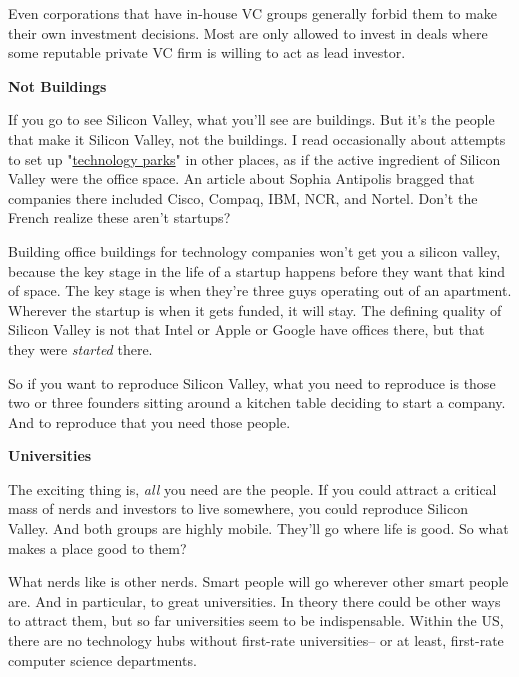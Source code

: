 Even corporations that
                  have in-house VC groups generally forbid them to make their
                  own investment decisions. Most are only allowed to invest in
                  deals where some reputable private VC firm is willing to act
                  as lead investor.

\textbf{Not Buildings}

If you go to see Silicon Valley, what you'll see
                  are buildings. But it's the people that make it Silicon
                  Valley, not the buildings. I read occasionally about attempts
                  to set up "\href{http://www.google.com/search?q=technology+park}{technology parks}" in other places, as if the active ingredient of Silicon
                  Valley were the office space. An article about Sophia
                  Antipolis bragged that companies there included Cisco, Compaq,
                  IBM, NCR, and Nortel. Don't the French realize these aren't
                  startups?

Building office buildings for technology
                  companies won't get you a silicon valley, because the key
                  stage in the life of a startup happens before they want that
                  kind of space. The key stage is when they're three guys
                  operating out of an apartment. Wherever the startup is when it
                  gets funded, it will stay. The defining quality of Silicon
                  Valley is not that Intel or Apple or Google have offices
                  there, but that they were \emph{started} there.

So
                  if you want to reproduce Silicon Valley, what you need to
                  reproduce is those two or three founders sitting around a
                  kitchen table deciding to start a company. And to reproduce
                  that you need those people.

\textbf{Universities}

The exciting thing is, \emph{all} you need are
                  the people. If you could attract a critical mass of nerds and
                  investors to live somewhere, you could reproduce Silicon
                  Valley. And both groups are highly mobile. They'll go where
                  life is good. So what makes a place good to them?

What
                  nerds like is other nerds. Smart people will go wherever other
                  smart people are. And in particular, to great universities. In
                  theory there could be other ways to attract them, but so far
                  universities seem to be indispensable. Within the US, there
                  are no technology hubs without first-rate universities-- or at
                  least, first-rate computer science departments.

